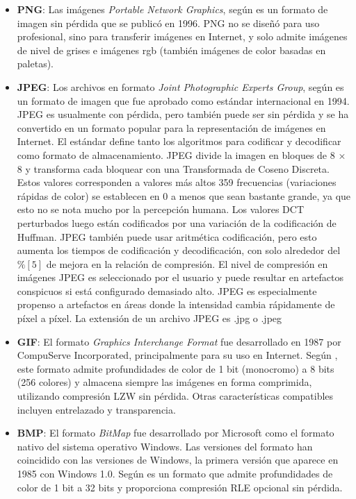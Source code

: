\begin{itemize}
    \item \textbf{PNG}: Las imágenes \textit{Portable Network Graphics}, según \cite{R2} es un formato de imagen sin pérdida que se publicó en 1996. PNG no se diseñó para uso profesional, sino para transferir imágenes en Internet, y solo admite imágenes de nivel de grises e imágenes rgb (también imágenes de color basadas en paletas).
    \item \textbf{JPEG}: Los archivos en formato \textit{Joint Photographic Experts Group}, según \cite{R2} es un formato de imagen que fue aprobado como estándar internacional en 1994. JPEG es usualmente con pérdida, pero también puede ser sin pérdida y se ha convertido en un formato popular para la representación de imágenes en Internet. El estándar define tanto los algoritmos para codificar y decodificar como formato de almacenamiento. JPEG divide la imagen en bloques de 8 × 8 y transforma cada bloquear con una Transformada de Coseno Discreta. Estos valores corresponden a valores más altos 359 frecuencias (variaciones rápidas de color) se establecen en 0 a menos que sean bastante grande, ya que esto no se nota mucho por la percepción humana. Los valores DCT perturbados luego están codificados por una variación de la codificación de Huffman. JPEG también puede usar aritmética codificación, pero esto aumenta los tiempos de codificación y decodificación, con solo alrededor del $\percent[5]$ de mejora en la relación de compresión. El nivel de compresión en imágenes JPEG es seleccionado por el usuario y puede resultar en artefactos conspicuos
    si está configurado demasiado alto. JPEG es especialmente propenso a artefactos en áreas donde la intensidad cambia rápidamente de píxel a píxel. La extensión de un archivo JPEG es .jpg o .jpeg
    \item \textbf{GIF}: El formato \textit{Graphics Interchange Format} fue desarrollado en 1987 por CompuServe Incorporated, principalmente para su uso en Internet. Según \cite{R3}, este formato admite profundidades de color de 1 bit (monocromo) a 8 bits (256 colores) y almacena siempre las imágenes en forma comprimida, utilizando compresión LZW sin pérdida. Otras características compatibles incluyen entrelazado y transparencia.
    \item \textbf{BMP}: El formato \textit{BitMap} fue desarrollado por Microsoft como el formato nativo del sistema operativo Windows. Las versiones del formato han coincidido con las versiones de Windows, la primera versión que aparece en 1985 con Windows 1.0. Según \cite{R3} es un formato  que admite profundidades de color de 1 bit a 32 bits y proporciona compresión RLE opcional sin pérdida.
\end{itemize}

